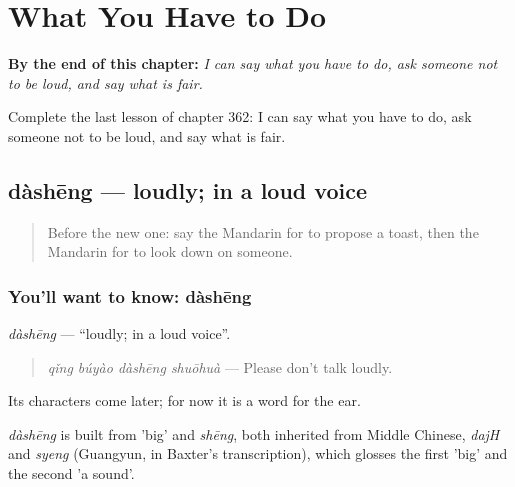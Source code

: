 
\chapter{What You Have to Do}
\label{ch:zh-what-you-have-to-do}

\begin{chapteropening}
\textbf{By the end of this chapter:} \emph{I can say what you have to do, ask someone not to be loud, and say what is fair.}

Complete the last lesson of chapter 362: I can say what you have to do, ask someone not to be loud, and say what is fair.
\end{chapteropening}

\section[dàshēng]{dàshēng — loudly; in a loud voice}

\label{lesson:ZH-C362-dasheng}



\begin{quote}
Before the new one: say the Mandarin for to propose a toast, then the Mandarin for to look down on someone.
\end{quote}

\subsection*{You'll want to know: dàshēng}
\emph{dàshēng} — \textquotedblleft{}loudly; in a loud voice\textquotedblright{}.

\begin{quote}
\emph{qǐng búyào dàshēng shuōhuà} — Please don't talk loudly.
\end{quote}

Its characters come later; for now it is a word for the ear.

\begin{cousinweb}
\emph{dàshēng} is built from  'big' and \emph{shēng}, both inherited from Middle Chinese, \emph{dajH} and \emph{syeng} (Guangyun, in Baxter's transcription), which glosses the first 'big' and the second 'a sound'.
\end{cousinweb}

